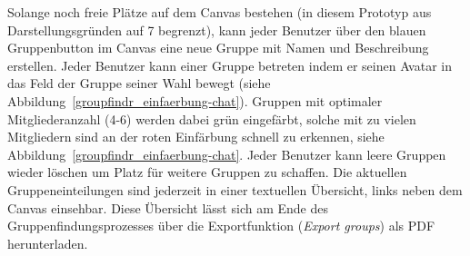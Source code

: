 Solange noch freie Plätze auf dem Canvas bestehen (in diesem Prototyp aus Darstellungsgründen auf 7 begrenzt), kann jeder Benutzer über den blauen Gruppenbutton im Canvas eine neue Gruppe mit Namen und Beschreibung erstellen. Jeder Benutzer kann einer Gruppe betreten indem er seinen Avatar in das Feld der Gruppe seiner Wahl bewegt (siehe Abbildung~\ref{groupfindr_einfaerbung-chat}). Gruppen mit optimaler Mitgliederanzahl (4-6) werden dabei grün eingefärbt, solche mit zu vielen Mitgliedern sind an der roten Einfärbung schnell zu erkennen, siehe Abbildung~\ref{groupfindr_einfaerbung-chat}. Jeder Benutzer kann leere Gruppen wieder löschen um Platz für weitere Gruppen zu schaffen. Die aktuellen Gruppeneinteilungen sind jederzeit in einer textuellen Übersicht, links neben dem Canvas einsehbar. Diese Übersicht lässt sich am Ende des Gruppenfindungsprozesses über die Exportfunktion (\emph{Export groups}) als PDF herunterladen.